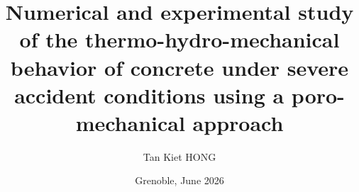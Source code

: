 \title{Numerical and experimental study of the thermo-hydro-mechanical behavior of concrete under severe accident conditions using a poro-mechanical approach}
\author{Tan Kiet HONG}
\date{Grenoble, June 2026}

\makeatletter
\newcommand{\institution}[1]{\def\@institution{#1}}
\newcommand{\supervisors}[1]{\def\@supervisors{#1}}
\newcommand{\institutioninfo}[1]{\def\@institutioninfo{#1}}
\def\@institution{}
\def\@supervisors{}
\def\@institutioninfo{}
\makeatother

\institution{UNIVERSITÉ GRENOBLE ALPES}

\supervisors{
Prof. Julien BAROTH, Université Grenoble Alpes\\[0.4cm]
Prof. Stefano DAL PONT, Université Grenoble Alpes
}

\institutioninfo{
This thesis is submitted in partial fulfillment of the requirements for the Master's degree in the International Program ``Geomechanics, Civil Engineering and Risks''.
\vspace{0.4cm}
The work was carried out during the Master 2 internship at 3SR Laboratory.
}

